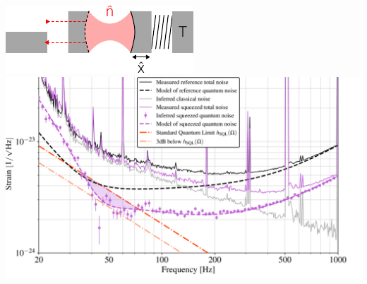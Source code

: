 \documentclass[
]{beamer}
\begin{document}
\begin{frame}{}
\begin{columns}
		\includegraphics{figures/drawing.pdf}
		\includegraphics[width=\textwidth]{figures/sub_sql.png}
	\end{columns}

\end{frame}


		



\end{document}
